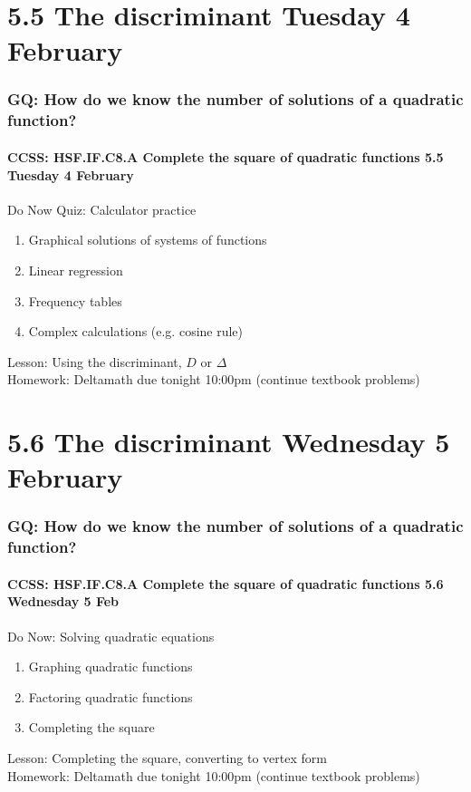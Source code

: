 \documentclass{beamer}
\begin{document}
\section{5.5 The discriminant \hfill Tuesday 4 February}
\frame
{
  \frametitle{GQ: How do we know the number of solutions of a quadratic function?}
  \framesubtitle{CCSS: HSF.IF.C8.A Complete the square of quadratic functions \hfill \alert{5.5 Tuesday 4 February}}

  \begin{block}{Do Now Quiz: Calculator practice}
    \begin{enumerate}
      \item Graphical solutions of systems of functions
      \item Linear regression
      \item Frequency tables
      \item Complex calculations (e.g. cosine rule)
    \end{enumerate}
    \end{block}
    Lesson: Using the discriminant, $D$ or $\Delta$\\ \smallskip
    Homework: Deltamath due tonight 10:00pm (continue textbook problems)
    }

\section{5.6 The discriminant \hfill Wednesday 5 February}
\frame
{
  \frametitle{GQ: How do we know the number of solutions of a quadratic function?}
  \framesubtitle{CCSS: HSF.IF.C8.A Complete the square of quadratic functions \hfill \alert{5.6 Wednesday 5 Feb}}

  \begin{block}{Do Now: Solving quadratic equations}
    \begin{enumerate}
      \item Graphing quadratic functions
      \item Factoring quadratic functions
      \item Completing the square
    \end{enumerate}
    \end{block}
    Lesson: Completing the square, converting to vertex form\\ \smallskip
    Homework: Deltamath due tonight 10:00pm (continue textbook problems)
    }
\end{document}
